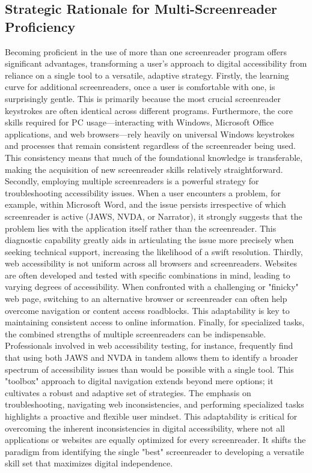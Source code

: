 \subsection{Strategic Rationale for Multi-Screenreader Proficiency}
Becoming proficient in the use of more than one screenreader program offers significant advantages, transforming a user's approach to digital accessibility from reliance on a single tool to a versatile, adaptive strategy.
Firstly, the learning curve for additional screenreaders, once a user is comfortable with one, is surprisingly gentle. This is primarily because the most crucial screenreader keystrokes are often identical across different programs. Furthermore, the core skills required for PC usage—interacting with Windows, Microsoft Office applications, and web browsers—rely heavily on universal Windows keystrokes and processes that remain consistent regardless of the screenreader being used.\supercite{kingsbury2025} This consistency means that much of the foundational knowledge is transferable, making the acquisition of new screenreader skills relatively straightforward.
Secondly, employing multiple screenreaders is a powerful strategy for troubleshooting accessibility issues. When a user encounters a problem, for example, within Microsoft Word, and the issue persists irrespective of which screenreader is active (JAWS, NVDA, or Narrator), it strongly suggests that the problem lies with the application itself rather than the screenreader. This diagnostic capability greatly aids in articulating the issue more precisely when seeking technical support, increasing the likelihood of a swift resolution.\supercite{kingsbury2025}
Thirdly, web accessibility is not uniform across all browsers and screenreaders. Websites are often developed and tested with specific combinations in mind, leading to varying degrees of accessibility. When confronted with a challenging or "finicky" web page, switching to an alternative browser or screenreader can often help overcome navigation or content access roadblocks.\supercite{kingsbury2025} This adaptability is key to maintaining consistent access to online information.
Finally, for specialized tasks, the combined strengths of multiple screenreaders can be indispensable. Professionals involved in web accessibility testing, for instance, frequently find that using both JAWS and NVDA in tandem allows them to identify a broader spectrum of accessibility issues than would be possible with a single tool.\supercite{kingsbury2025} This "toolbox" approach to digital navigation extends beyond mere options; it cultivates a robust and adaptive set of strategies. The emphasis on troubleshooting, navigating web inconsistencies, and performing specialized tasks highlights a proactive and flexible user mindset. This adaptability is critical for overcoming the inherent inconsistencies in digital accessibility, where not all applications or websites are equally optimized for every screenreader. It shifts the paradigm from identifying the single "best" screenreader to developing a versatile skill set that maximizes digital independence.

